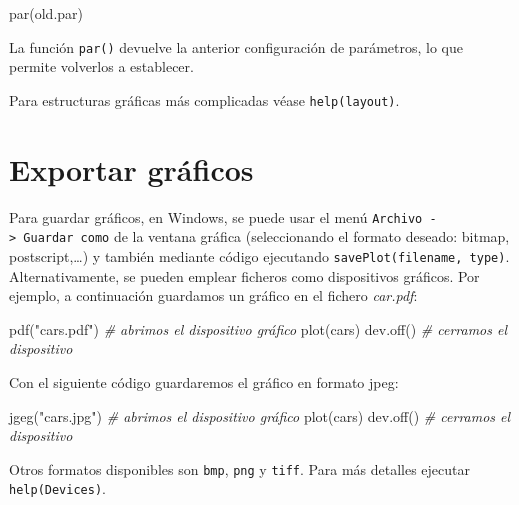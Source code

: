 \documentclass[
]{book}
\newenvironment{Shaded}{\begin{snugshade}}{\end{snugshade}}
\newcommand{\CommentTok}[1]{\textcolor[rgb]{0.56,0.35,0.01}{\textit{#1}}}
\newcommand{\FunctionTok}[1]{\textcolor[rgb]{0.00,0.00,0.00}{#1}}
\newcommand{\NormalTok}[1]{#1}
\newcommand{\StringTok}[1]{\textcolor[rgb]{0.31,0.60,0.02}{#1}}
\theoremstyle{break}
\theoremstyle{nonumberplain}
\begin{document}
\begin{Shaded}
\begin{Highlighting}[]
\FunctionTok{par}\NormalTok{(old.par)}
\end{Highlighting}
\end{Shaded}

La función \texttt{par()} devuelve la anterior configuración de parámetros,
lo que permite volverlos a establecer.

Para estructuras gráficas más complicadas véase \texttt{help(layout)}.

\hypertarget{exportar-gruxe1ficos}{%
\section{Exportar gráficos}\label{exportar-gruxe1ficos}}

Para guardar gráficos, en Windows, se puede usar el menú \texttt{Archivo\ -\textgreater{}\ Guardar\ como} de la ventana gráfica (seleccionando el formato deseado: bitmap, postscript,\ldots)
y también mediante código ejecutando \texttt{savePlot(filename,\ type)}.
Alternativamente, se pueden emplear ficheros como dispositivos gráficos. Por ejemplo, a continuación guardamos un gráfico en el fichero \emph{car.pdf}:

\begin{Shaded}
\begin{Highlighting}[]
\FunctionTok{pdf}\NormalTok{(}\StringTok{"cars.pdf"}\NormalTok{)   }\CommentTok{\# abrimos el dispositivo gráfico}
\FunctionTok{plot}\NormalTok{(cars)}
\FunctionTok{dev.off}\NormalTok{()         }\CommentTok{\# cerramos el dispositivo}
\end{Highlighting}
\end{Shaded}

Con el siguiente código guardaremos el gráfico en formato jpeg:

\begin{Shaded}
\begin{Highlighting}[]
\FunctionTok{jgeg}\NormalTok{(}\StringTok{"cars.jpg"}\NormalTok{)  }\CommentTok{\# abrimos el dispositivo gráfico}
\FunctionTok{plot}\NormalTok{(cars)}
\FunctionTok{dev.off}\NormalTok{()         }\CommentTok{\# cerramos el dispositivo}
\end{Highlighting}
\end{Shaded}

Otros formatos disponibles son \texttt{bmp}, \texttt{png} y \texttt{tiff}. Para más detalles ejecutar \texttt{help(Devices)}.
\end{document}
